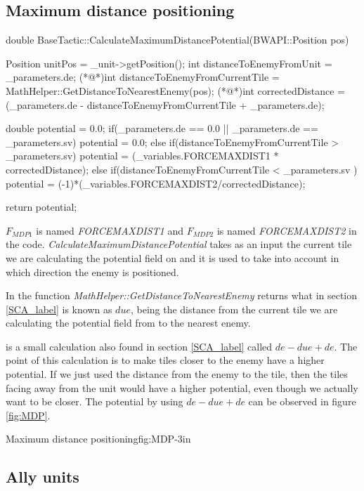 {	\subsection{Maximum distance positioning}
		\begin{Sourcecode}[caption=Maximum distance]
double BaseTactic::CalculateMaximumDistancePotential(BWAPI::Position pos)
{
	Position unitPos = _unit->getPosition();
	int distanceToEnemyFromUnit = _parameters.de;
	(*@\lnote@*)int distanceToEnemyFromCurrentTile = MathHelper::GetDistanceToNearestEnemy(pos);
	(*@\lnote@*)int correctedDistance = (_parameters.de - distanceToEnemyFromCurrentTile + _parameters.de);

	double potential = 0.0;
	if(_parameters.de == 0.0 || _parameters.de == _parameters.sv)
		potential = 0.0;
	else if(distanceToEnemyFromCurrentTile > _parameters.sv)
		potential = (_variables.FORCEMAXDIST1 * correctedDistance);
	else if(distanceToEnemyFromCurrentTile < _parameters.sv )
		potential = (-1)*(_variables.FORCEMAXDIST2/correctedDistance);
	
	return potential;
}
\end{Sourcecode}
	$F_{MDP1}$ is named \textit{FORCEMAXDIST1} and $F_{MDP2}$ is named \textit{FORCEMAXDIST2} in the code.
	\textit{CalculateMaximumDistancePotential} takes as an input the current tile we are calculating the potential field on and it is used to take into account in which direction the enemy is positioned.
	
	In  the function \textit{MathHelper::GetDistanceToNearestEnemy} returns what in section \ref{SCA_label} is known as $due$, being the distance from the current tile we are calculating the potential field from to the nearest enemy.
	
	 is a small calculation also found in section \ref{SCA_label} called $de - due + de$. The point of this calculation is to make tiles closer to the enemy have a higher potential. If we just used the distance from the enemy to the tile, then the tiles facing away from the unit would have a higher potential, even though we actually want to be closer. The potential by using $de - due + de$ can be observed in figure \ref{fig:MDP}.
	
			{Maximum distance positioning}{fig:MDP}{-3in}
		
	\subsection{Ally units}
	
}
